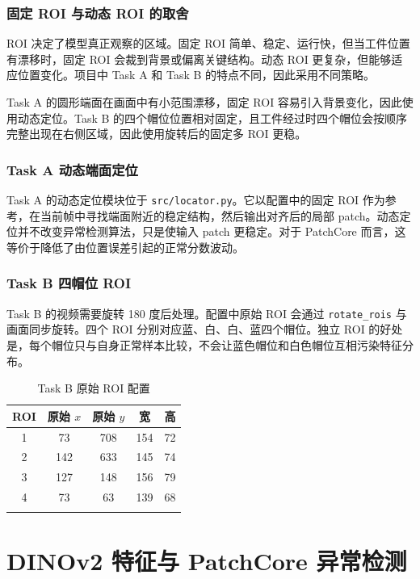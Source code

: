 \documentclass[12pt,hyperref,a4paper,UTF8,fontset=fandol]{ctexart}
\begin{document}
\subsubsection{固定 ROI 与动态 ROI 的取舍}

ROI 决定了模型真正观察的区域。固定 ROI 简单、稳定、运行快，但当工件位置有漂移时，固定 ROI 会裁到背景或偏离关键结构。动态 ROI 更复杂，但能够适应位置变化。项目中 Task A 和 Task B 的特点不同，因此采用不同策略。

Task A 的圆形端面在画面中有小范围漂移，固定 ROI 容易引入背景变化，因此使用动态定位。Task B 的四个帽位位置相对固定，且工件经过时四个帽位会按顺序完整出现在右侧区域，因此使用旋转后的固定多 ROI 更稳。

\subsubsection{Task A 动态端面定位}

Task A 的动态定位模块位于 \texttt{src/locator.py}。它以配置中的固定 ROI 作为参考，在当前帧中寻找端面附近的稳定结构，然后输出对齐后的局部 patch。动态定位并不改变异常检测算法，只是使输入 patch 更稳定。对于 PatchCore 而言，这等价于降低了由位置误差引起的正常分数波动。

\subsubsection{Task B 四帽位 ROI}

Task B 的视频需要旋转 180 度后处理。配置中原始 ROI 会通过 \texttt{rotate\_rois} 与画面同步旋转。四个 ROI 分别对应蓝、白、白、蓝四个帽位。独立 ROI 的好处是，每个帽位只与自身正常样本比较，不会让蓝色帽位和白色帽位互相污染特征分布。

\begin{longtable}{ccccc}
\toprule
ROI & 原始 $x$ & 原始 $y$ & 宽 & 高 \\
\midrule
1 & 73 & 708 & 154 & 72 \\
2 & 142 & 633 & 145 & 74 \\
3 & 127 & 148 & 156 & 79 \\
4 & 73 & 63 & 139 & 68 \\
\bottomrule
\caption{Task B 原始 ROI 配置}
\end{longtable}

\newpage
\section{DINOv2 特征与 PatchCore 异常检测}
\end{document}
